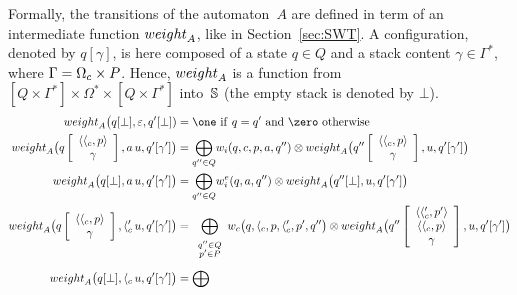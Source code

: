 Formally, the transitions of the automaton~$A$ are defined
in term of %
an intermediate function $\weight_A$, like in Section~\ref{sec:SWT}.
A configuration, denoted by $q[\gamma]$, 
is here composed of a state $q \in Q$ 
and a stack content $\gamma \in \Gamma^*$, 
where $\Gamma = \Omegac \times P$.
Hence, $\weight_A$ is a function from 
$[Q \times \Gamma^*] \times \Omega^* \times [Q \times \Gamma^*]$ into~$\mathbb{S}$
(the empty stack is denoted by $\bot$). 
%
\begin{align}
\weight_A\bigl(\config{q}{\bot}, \varepsilon, \config{q'}{\bot}) & = \one
\mathrm{~if~} q = q' \mathrm{~and~} \zero \mathrm{~otherwise}\label{eq:SWVPA-weight}\\
\weight_A\bigl(\configup{q}{\<{\call{c}}, p>\stackup\gamma}, a\, u, 
               \config{q'}{\gamma'}\bigr) & =  
 {\displaystyle\bigoplus_{q'' \in Q}} \weii(q, c, p, a, q'') 
  \otimes \weight_A\bigl(\configup{q''}{\<{\call{c}}, p> \stackup \gamma}, u, 
                         \config{q'}{\gamma'}\bigr)\nonumber\\
\weight_A\bigl(\config{q}{\bot}, a\, u, 
               \config{q'}{\gamma'}\bigr) & =  
  {\displaystyle\bigoplus_{q'' \in Q}} \weiei(q, a, q'') 
   \otimes \weight_A\bigl(\config{q''}{\bot}, u, \config{q'}{\gamma'}\bigr)\nonumber\\
%
\weight_A\bigl(\configup{q}{\<{\call{c}}, p>\stackup\gamma}, {\call{c}'}\, u, 
               \config{q'}{\gamma'}\bigr) & =  
 {\displaystyle\bigoplus_{\begin{array}{c}
                          \scriptstyle q'' \in Q\\[-1ex]
                          \scriptstyle p' \in P
                          \end{array}}}
 \weic\bigl(q, {\call{c}}, p, {\call{c}'}, p', q''\bigr) 
 \otimes \weight_A\bigl(\configup{q''}{\<{\call{c}'}, p'>\stackup \<{\call{c}}, p>\stackup \gamma}, u, 
                        \config{q'}{\gamma'}\bigr)\nonumber\\[1mm]
%
\weight_A\bigl(\config{q}{\bot}, {\call{c}}\, u, 
               \config{q'}{\gamma'}\bigr) & =  
 {\displaystyle\bigoplus_{\begin{array}{c}

\end{array}}}
\end{align}
